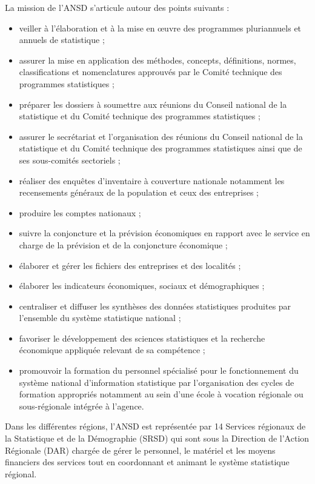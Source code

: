 \documentclass[12pt,a4paper]{report}
\begin{document}
La mission de l'ANSD s'articule autour des points suivants :
\begin{itemize}[nosep]
\item veiller à l'élaboration et à la mise en œuvre des programmes pluriannuels et annuels de statistique ;
\item assurer la mise en application des méthodes, concepts, définitions, normes, classifications et nomenclatures approuvés par le Comité technique des programmes statistiques ;
\item préparer les dossiers à soumettre aux réunions du Conseil national de la statistique et du Comité technique des programmes statistiques ;
\item assurer le secrétariat et l'organisation des réunions du Conseil national de la statistique et du Comité technique des programmes statistiques ainsi que de ses sous-comités sectoriels ;
\item réaliser des enquêtes d'inventaire à couverture nationale notamment les recensements généraux de la population et ceux des entreprises ;
\item produire les comptes nationaux ;
\item suivre la conjoncture et la prévision économiques en rapport avec le service en charge de la prévision et de la conjoncture économique ;
\item élaborer et gérer les fichiers des entreprises et des localités ;
\item élaborer les indicateurs économiques, sociaux et démographiques ;
\item centraliser et diffuser les synthèses des données statistiques produites par l'ensemble du système statistique national ;
\item favoriser le développement des sciences statistiques et la recherche économique appliquée relevant de sa compétence ;
\item promouvoir la formation du personnel spécialisé pour le fonctionnement du système national d'information statistique par l'organisation des cycles de formation appropriés notamment au sein d'une école à vocation régionale ou sous-régionale intégrée à l'agence.
\end{itemize}

Dans les différentes régions, l'ANSD est représentée par 14 Services régionaux de la Statistique et de la Démographie (SRSD) qui sont sous la Direction de l'Action Régionale (DAR) chargée de gérer le personnel, le matériel et les moyens financiers des services tout en coordonnant et animant le système statistique régional.
\end{document}
